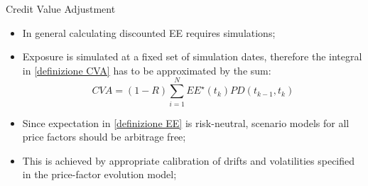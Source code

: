 \documentclass[11pt]{beamer}
\begin{document}
\begin{frame}{Credit Value Adjustment}
\begin{itemize}
\item In general calculating discounted EE requires simulations;
\item Exposure is simulated at a fixed set of simulation dates, therefore the integral in \eqref{definizione CVA} has to be approximated by the sum:
\begin{equation}\label{definizione CVA discreta}
CVA = (1-R) \sum\limits_{i=1}^N EE^\star (t_k) PD(t_{k-1},t_k)
\end{equation} 
\item Since expectation in \eqref{definizione EE} is risk-neutral, scenario models for all price factors should be arbitrage free;
\item This is achieved by appropriate calibration of drifts and volatilities specified in the price-factor evolution model;
\end{itemize}
\end{frame}
\end{document}
